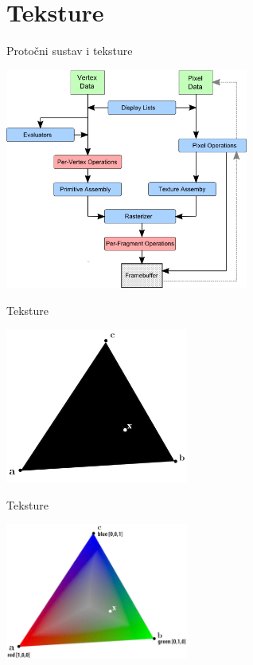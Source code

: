 \documentclass[9pt]{beamer}
\begin{document}
\section{Teksture}
\begin{frame}{Protočni sustav i teksture}
	\begin{center}
		\includegraphics[width=8cm]{./slike/graphics_pipeline_06.png}
	\end{center}
\end{frame}

\begin{frame}{Teksture}
	\begin{center}
		\includegraphics[width=6cm]{./slike/slide_023.jpg}
	\end{center}
\end{frame}

\begin{frame}{Teksture}
	\begin{center}
		\includegraphics[width=6cm]{./slike/slide_024.jpg}
	\end{center}
\end{frame}
\end{document}
